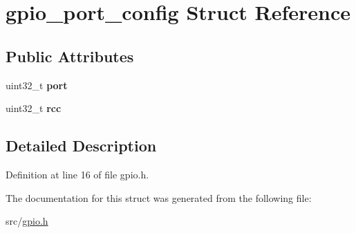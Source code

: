 \hypertarget{structgpio__port__config}{}\section{gpio\+\_\+port\+\_\+config Struct Reference}
\label{structgpio__port__config}
\subsection*{Public Attributes}
\begin{DoxyCompactItemize}
\item 
\hypertarget{structgpio__port__config_a37f5f40d14a183161a8dd4fd9ede9d05}{}uint32\+\_\+t {\bfseries port}\label{structgpio__port__config_a37f5f40d14a183161a8dd4fd9ede9d05}

\item 
\hypertarget{structgpio__port__config_a00cb058b3750f38e4b3c5be01e9b0f25}{}uint32\+\_\+t {\bfseries rcc}\label{structgpio__port__config_a00cb058b3750f38e4b3c5be01e9b0f25}

\end{DoxyCompactItemize}


\subsection{Detailed Description}


Definition at line 16 of file gpio.\+h.



The documentation for this struct was generated from the following file\+:\begin{DoxyCompactItemize}
\item 
src/\hyperlink{gpio_8h}{gpio.\+h}\end{DoxyCompactItemize}
